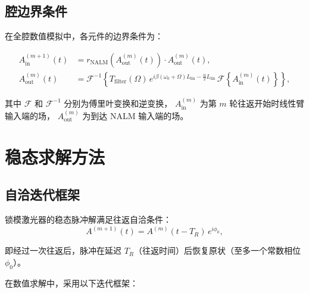 \documentclass[11pt,a4paper]{ctexart}
\begin{document}
\subsection{腔边界条件}

在全腔数值模拟中，各元件的边界条件为：

\begin{align}
  A_{\text{in}}^{(m+1)}(t) &=
  r_{\text{NALM}}\!\left(A_{\text{out}}^{(m)}(t)\right)
  \cdot A_{\text{out}}^{(m)}(t), \\[4pt]
  A_{\text{out}}^{(m)}(t) &=
  \mathcal{F}^{-1}\!\left\{
    T_{\text{filter}}(\Omega) \,
    e^{i\beta(\omega_0+\Omega)L_{\text{lin}} - \frac{\alpha}{2}L_{\text{lin}}}
    \, \mathcal{F}\!\left\{A_{\text{in}}^{(m)}(t)\right\}
  \right\},
\end{align}

其中 $\mathcal{F}$ 和 $\mathcal{F}^{-1}$ 分别为傅里叶变换和逆变换，
$A_{\text{in}}^{(m)}$ 为第 $m$ 轮往返开始时线性臂输入端的场，
$A_{\text{out}}^{(m)}$ 为到达 NALM 输入端的场。

\section{稳态求解方法}
\label{sec:steady}

\subsection{自洽迭代框架}

锁模激光器的稳态脉冲解满足往返自洽条件：
\begin{equation}
  A^{(m+1)}(t) = A^{(m)}(t - T_R) \, e^{i\phi_0},
  \label{eq:self_consistency}
\end{equation}

即经过一次往返后，脉冲在延迟 $T_R$（往返时间）后恢复原状（至多一个常数相位 $\phi_0$）。

在数值求解中，采用以下迭代框架：
\end{document}
